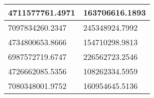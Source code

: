 \begin{tabular}{|l|l|}
\hline
4711577761.4971&163706616.1893\\\hline
7097834260.2347&245348924.7992\\\hline
4734800653.8666&154710298.9813\\\hline
6987572719.6747&226562723.2546\\\hline
4726662085.5356&108262334.5959\\\hline
7080348001.9752&160954645.5136\\\hline
\end{tabular}
